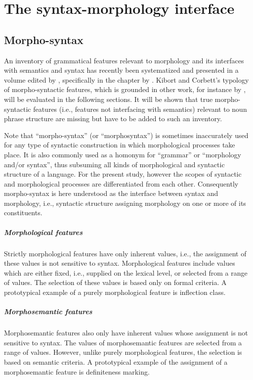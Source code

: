 
\chapter{The syntax-morphology interface}
\label{syntax-morphology-interface}

\section{Morpho-syntax}
An inventory of grammatical features relevant to morphology and its interfaces with semantics and syntax has recently been systematized and presented in a volume edited by \citet{kibort-etal2010}, specifically in the chapter by \citet{kibort2010a}. Kibort and Corbett's typology of morpho-syntactic features, which is grounded in other work, for instance by \citet{aronoff1994,corbett1987,carstairs-mccarthy2000a,corbett2006,corbett-etal2006,bickel-etal2007,kibort2008a}, will be evaluated in the following sections. It will be shown that true morpho-syntactic features (i.e., features not interfacing with semantics) relevant to noun phrase structure are missing but have to be added to such an inventory.

Note that “morpho-syntax” (or “morphosyntax”) is sometimes inaccurately used for any type of syntactic construction in which morphological processes take place. It is also commonly used as a homonym for “grammar” or “morphology and/or syntax”, thus subsuming all kinds of morphological and syntactic structure of a language. For the present study, however the scopes of syntactic and morphological processes are differentiated from each other. Consequently morpho-syntax is here understood as the interface between syntax and morphology, i.e., syntactic structure assigning morphology on one or more of its constituents.
\paragraph*{Morphological features} 
Strictly morphological features have only inherent values, i.e., the assignment of these values is not sensitive to syntax. Morphological features include values which are either fixed, i.e., supplied on the lexical level, or selected from a range of values. The selection of these values is based only on formal criteria. A prototypical example of a purely morphological feature is inflection class.
\paragraph*{Morphosemantic features} 
Morphosemantic features also only have inherent values whose assignment is not sensitive to syntax. The values of morphosemantic features are selected from a range of values. However, unlike purely morphological features, the selection is based on semantic criteria. A prototypical example of the assignment of a morphosemantic feature is definiteness marking.
